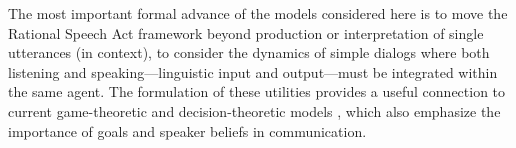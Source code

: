 \documentclass[12pt, floatsintext, jou]{apa6}
\begin{document}
The most important formal advance of the models considered here is to move the Rational Speech Act framework beyond production or interpretation of single utterances (in context), to consider the dynamics of simple dialogs where both listening and speaking---linguistic input and output---must be integrated within the same agent. The formulation of these utilities provides a useful connection to current game-theoretic and decision-theoretic models \cite{VogelBodoiaPottsJurafsky13_GricePOMDP, VanRooy03_QuestioningDecisionProblems}, which also emphasize the importance of goals and speaker beliefs in communication.




\end{document}
